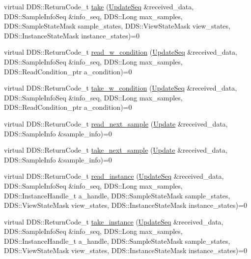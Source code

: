 \begin{DoxyCompactItemize}
\item 
virtual DDS::ReturnCode\_\-t \hyperlink{classKnowledge_1_1UpdateDataReader_a4779729ac92314687c87b7a959c84af1}{take} (\hyperlink{namespaceKnowledge_ab62e46316b954f0d249e0e45de7059dc}{UpdateSeq} \&received\_\-data, DDS::SampleInfoSeq \&info\_\-seq, DDS::Long max\_\-samples, DDS::SampleStateMask sample\_\-states, DDS::ViewStateMask view\_\-states, DDS::InstanceStateMask instance\_\-states)=0
\item 
virtual DDS::ReturnCode\_\-t \hyperlink{classKnowledge_1_1UpdateDataReader_a0613fe0c358530af6b6eafb353775dbf}{read\_\-w\_\-condition} (\hyperlink{namespaceKnowledge_ab62e46316b954f0d249e0e45de7059dc}{UpdateSeq} \&received\_\-data, DDS::SampleInfoSeq \&info\_\-seq, DDS::Long max\_\-samples, DDS::ReadCondition\_\-ptr a\_\-condition)=0
\item 
virtual DDS::ReturnCode\_\-t \hyperlink{classKnowledge_1_1UpdateDataReader_a2cc66d38d8b528fcb76a8e8f5e4b9bfb}{take\_\-w\_\-condition} (\hyperlink{namespaceKnowledge_ab62e46316b954f0d249e0e45de7059dc}{UpdateSeq} \&received\_\-data, DDS::SampleInfoSeq \&info\_\-seq, DDS::Long max\_\-samples, DDS::ReadCondition\_\-ptr a\_\-condition)=0
\item 
virtual DDS::ReturnCode\_\-t \hyperlink{classKnowledge_1_1UpdateDataReader_a3a01192e6a4e66d03cd71dc3d5bcb5cf}{read\_\-next\_\-sample} (\hyperlink{structKnowledge_1_1Update}{Update} \&received\_\-data, DDS::SampleInfo \&sample\_\-info)=0
\item 
virtual DDS::ReturnCode\_\-t \hyperlink{classKnowledge_1_1UpdateDataReader_ae03783b27b1c1cf0718e5f8b2921c1de}{take\_\-next\_\-sample} (\hyperlink{structKnowledge_1_1Update}{Update} \&received\_\-data, DDS::SampleInfo \&sample\_\-info)=0
\item 
virtual DDS::ReturnCode\_\-t \hyperlink{classKnowledge_1_1UpdateDataReader_a502069464da539d0e5997d4ba2641c23}{read\_\-instance} (\hyperlink{namespaceKnowledge_ab62e46316b954f0d249e0e45de7059dc}{UpdateSeq} \&received\_\-data, DDS::SampleInfoSeq \&info\_\-seq, DDS::Long max\_\-samples, DDS::InstanceHandle\_\-t a\_\-handle, DDS::SampleStateMask sample\_\-states, DDS::ViewStateMask view\_\-states, DDS::InstanceStateMask instance\_\-states)=0
\item 
virtual DDS::ReturnCode\_\-t \hyperlink{classKnowledge_1_1UpdateDataReader_ad7eba351fa1bd50038a3249f130636cd}{take\_\-instance} (\hyperlink{namespaceKnowledge_ab62e46316b954f0d249e0e45de7059dc}{UpdateSeq} \&received\_\-data, DDS::SampleInfoSeq \&info\_\-seq, DDS::Long max\_\-samples, DDS::InstanceHandle\_\-t a\_\-handle, DDS::SampleStateMask sample\_\-states, DDS::ViewStateMask view\_\-states, DDS::InstanceStateMask instance\_\-states)=0

\end{DoxyCompactItemize}
